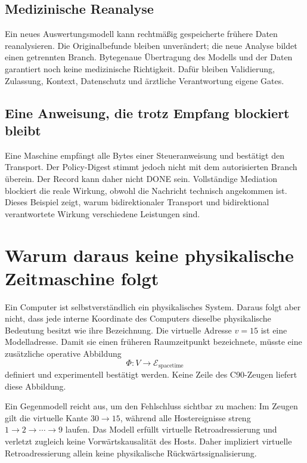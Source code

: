 \documentclass[11pt,a4paper]{article}
\theoremstyle{remark}
\begin{document}
\subsection{Medizinische Reanalyse}

Ein neues Auswertungsmodell kann rechtmäßig gespeicherte frühere Daten
reanalysieren. Die Originalbefunde bleiben unverändert; die neue Analyse
bildet einen getrennten Branch. Bytegenaue Übertragung des Modells und der
Daten garantiert noch keine medizinische Richtigkeit. Dafür bleiben
Validierung, Zulassung, Kontext, Datenschutz und ärztliche Verantwortung
eigene Gates.

\subsection{Eine Anweisung, die trotz Empfang blockiert bleibt}

Eine Maschine empfängt alle Bytes einer Steueranweisung und bestätigt den
Transport. Der Policy-Digest stimmt jedoch nicht mit dem autorisierten
Branch überein. Der Record kann daher nicht DONE sein. Vollständige Mediation
blockiert die reale Wirkung, obwohl die Nachricht technisch angekommen ist.
Dieses Beispiel zeigt, warum bidirektionaler Transport und
bidirektional verantwortete Wirkung verschiedene Leistungen sind.

\section{Warum daraus keine physikalische Zeitmaschine folgt}

Ein Computer ist selbstverständlich ein physikalisches System. Daraus folgt
aber nicht, dass jede interne Koordinate des Computers dieselbe physikalische
Bedeutung besitzt wie ihre Bezeichnung. Die virtuelle Adresse \(v=15\) ist
eine Modelladresse. Damit sie einen früheren Raumzeitpunkt bezeichnete,
müsste eine zusätzliche operative Abbildung
\[
 \Phi:V\longrightarrow\mathcal{E}_{\mathrm{spacetime}}
\]
definiert und experimentell bestätigt werden. Keine Zeile des C90-Zeugen
liefert diese Abbildung.

Ein Gegenmodell reicht aus, um den Fehlschluss sichtbar zu machen: Im Zeugen
gilt die virtuelle Kante \(30\rightarrow15\), während alle Hostereignisse
streng \(1\rightarrow2\rightarrow\cdots\rightarrow9\) laufen. Das Modell
erfüllt virtuelle Retroadressierung und verletzt zugleich keine
Vorwärtskausalität des Hosts. Daher impliziert virtuelle
Retroadressierung allein keine physikalische Rückwärtssignalisierung.
\end{document}
